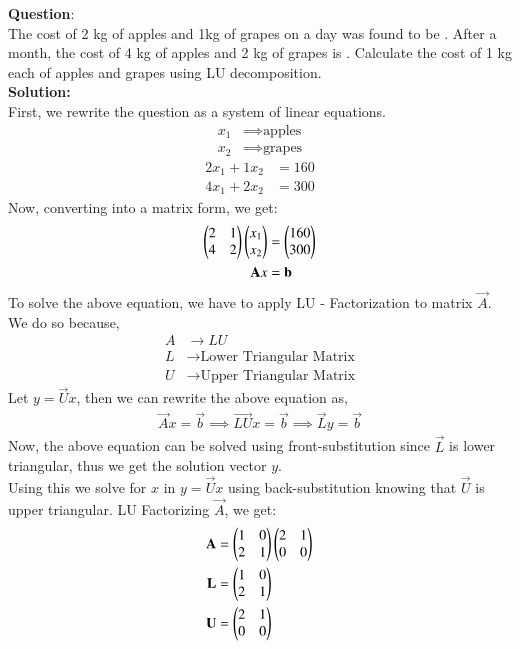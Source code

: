 \documentclass[journal]{IEEEtran}
\begin{document}
	
\textbf{Question}:\\
The cost of 2 kg of apples and 1kg of grapes on a day was found to be . After a
month, the cost of 4 kg of apples and 2 kg of grapes is . Calculate the cost of 1 kg each of apples and grapes using LU decomposition.  \\
\textbf{Solution: }\\
First, we rewrite the question as a system of linear equations.
\begin{align}
	x_1 &\implies \text{apples} \\
	x_2 &\implies \text{grapes}
\end{align}
\begin{align}
	2x_1 + 1x_2 &= 160 \\
	4x_1 + 2x_2 &= 300 
\end{align}
Now, converting into a matrix form, we get:
\begin{align}
	\begin{pmatrix}2&1\\4&2\end{pmatrix}\begin{pmatrix}x_1 \\ x_2\end{pmatrix} &= \begin{pmatrix}160 \\ 300\end{pmatrix} \\ 
	\mathbf{A}x &= \mathbf{b}
\end{align}
To solve the above equation, we have to apply LU - Factorization to matrix $\vec{A}$. \\
We do so because, 
\begin{align}
	A &\rightarrow LU \\
	L &\rightarrow \text{Lower Triangular Matrix} \\
	U &\rightarrow \text{Upper Triangular Matrix}
\end{align}
Let $y = \vec{U}x$, then we can rewrite the above equation as,
\begin{align}
	\vec{A}x = \vec{b} \implies \vec{LU}x = \vec{b} \implies \vec{L}y = \vec{b}
\end{align}
Now, the above equation can be solved using front-substitution since $\vec{L}$ is lower triangular, thus we get the solution vector $y$. \\
Using this we solve for $x$ in $y = \vec{U}x$ using back-substitution knowing that $\vec{U}$ is upper triangular. LU Factorizing $\vec{A}$, we get:
\begin{align}
	\mathbf{A} &= \begin{pmatrix}1&0\\2&1\end{pmatrix}\begin{pmatrix}2&1\\0&0\end{pmatrix} \\ 
	\mathbf{L} &= \begin{pmatrix}1&0\\2&1\end{pmatrix} \\
	\mathbf{U} &= \begin{pmatrix}2&1\\0&0\end{pmatrix}
\end{align}
\end{document}
